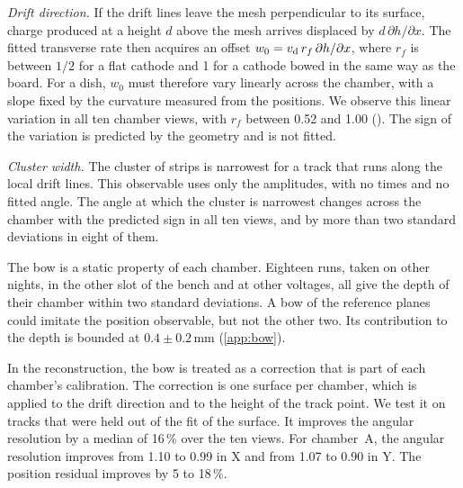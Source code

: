 \emph{Drift direction.} If the drift lines leave the mesh perpendicular to its surface, charge produced at a height
$d$ above the mesh arrives displaced by $d\,\partial h/\partial x$. The fitted transverse rate then acquires an offset
$w_0=v_\mathrm{d}\,r_f\,\partial h/\partial x$, where $r_f$ is between $1/2$ for a flat cathode and 1 for a cathode bowed in the
same way as the board. For a dish, $w_0$ must therefore vary linearly across the chamber, with a slope fixed by the
curvature measured from the positions. We observe this linear variation in all ten chamber views, with $r_f$ between
0.52 and 1.00 (). The sign of the variation is predicted by the geometry and is not fitted.

\emph{Cluster width.} The cluster of strips is narrowest for a track that runs along the local drift lines. This
observable uses only the amplitudes, with no times and no fitted angle. The angle at which the cluster is narrowest
changes across the chamber with the predicted sign in all ten views, and by more than two standard deviations in eight
of them.

The bow is a static property of each chamber. Eighteen runs, taken on other nights, in the other slot of the bench
and at other voltages, all give the depth of their chamber within two standard deviations. A bow of the reference
planes could imitate the position observable, but not the other two. Its contribution to the depth is bounded at
$0.4\pm0.2$\,mm (\cref{app:bow}).

In the reconstruction, the bow is treated as a correction that is part of each chamber's calibration. The correction
is one surface per chamber, which is applied to the drift direction and to the height of the track point. We test it
on tracks that were held out of the fit of the surface. It improves the angular resolution by a median of 16\,\% over
the ten views. For chamber~A, the angular resolution improves from 1.10 to 0.99\textdegree{} in X and from 1.07 to
0.90\textdegree{} in Y. The position residual improves by 5 to 18\,\%.

